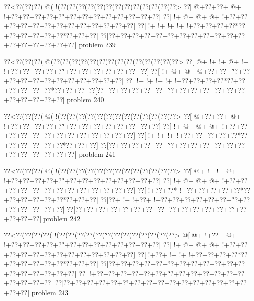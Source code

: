 \vbox{\vbox{\goo
\0??<\0??(\0??(\0??(\- @(\- !(\0??(\0??(\0??(\0??(\0??(\0??(\0??(\0??(\0??(\0??(\0??(\0??(\0??>
\0??[\- @+\0??+\0??+\- @+\- !+\0??+\0??+\0??+\0??+\0??+\0??+\0??+\0??+\0??+\0??+\0??+\0??+\0??]
\0??[\- !+\- @+\- @+\- @+\- !+\0??+\0??+\0??+\0??+\0??+\0??+\0??+\0??+\0??+\0??+\0??+\0??+\0??]
\0??[\- !+\- !+\- !+\- !+\- !+\0??+\0??+\0??+\0??*\0??+\0??+\0??+\0??+\0??+\0??*\0??+\0??+\0??]
\0??[\0??+\0??+\0??+\0??+\0??+\0??+\0??+\0??+\0??+\0??+\0??+\0??+\0??+\0??+\0??+\0??+\0??+\0??]
}
\hfil problem 239\hfil\break
}



\vbox{\vbox{\goo
\0??<\0??(\0??(\0??(\- @(\0??(\0??(\0??(\0??(\0??(\0??(\0??(\0??(\0??(\0??(\0??(\0??(\0??(\0??>
\0??[\- @+\- !+\- !+\- @+\- !+\- !+\0??+\0??+\0??+\0??+\0??+\0??+\0??+\0??+\0??+\0??+\0??+\0??]
\0??[\- !+\- @+\- @+\- @+\0??+\0??+\0??+\0??+\0??+\0??+\0??+\0??+\0??+\0??+\0??+\0??+\0??+\0??]
\0??[\- !+\- !+\- !+\- !+\- !+\0??+\0??+\0??+\0??*\0??+\0??+\0??+\0??+\0??+\0??*\0??+\0??+\0??]
\0??[\0??+\0??+\0??+\0??+\0??+\0??+\0??+\0??+\0??+\0??+\0??+\0??+\0??+\0??+\0??+\0??+\0??+\0??]
}
\hfil problem 240\hfil\break
}



\vbox{\vbox{\goo
\0??<\0??(\0??(\0??(\- @(\- !(\0??(\0??(\0??(\0??(\0??(\0??(\0??(\0??(\0??(\0??(\0??(\0??(\0??>
\0??[\- @+\0??+\0??+\- @+\- !+\0??+\0??+\0??+\0??+\0??+\0??+\0??+\0??+\0??+\0??+\0??+\0??+\0??]
\0??[\- !+\- @+\- @+\- @+\- !+\0??+\0??+\0??+\0??+\0??+\0??+\0??+\0??+\0??+\0??+\0??+\0??+\0??]
\0??[\- !+\- !+\- !+\- !+\0??+\0??+\0??+\0??+\0??*\0??+\0??+\0??+\0??+\0??+\0??*\0??+\0??+\0??]
\0??[\0??+\0??+\0??+\0??+\0??+\0??+\0??+\0??+\0??+\0??+\0??+\0??+\0??+\0??+\0??+\0??+\0??+\0??]
}
\hfil problem 241\hfil\break
}



\vbox{\vbox{\goo
\0??<\0??(\0??(\0??(\- @(\- !(\0??(\0??(\0??(\0??(\0??(\0??(\0??(\0??(\0??(\0??(\0??(\0??(\0??>
\0??[\- @+\- !+\- !+\- @+\- !+\0??+\0??+\0??+\0??+\0??+\0??+\0??+\0??+\0??+\0??+\0??+\0??+\0??]
\0??[\- !+\- @+\- @+\- @+\- !+\0??+\0??+\0??+\0??+\0??+\0??+\0??+\0??+\0??+\0??+\0??+\0??+\0??]
\0??[\- !+\0??+\0??*\- !+\0??+\0??+\0??+\0??+\0??*\0??+\0??+\0??+\0??+\0??+\0??*\0??+\0??+\0??]
\0??[\0??+\- !+\- !+\0??+\- !+\0??+\0??+\0??+\0??+\0??+\0??+\0??+\0??+\0??+\0??+\0??+\0??+\0??]
\0??[\0??+\0??+\0??+\0??+\0??+\0??+\0??+\0??+\0??+\0??+\0??+\0??+\0??+\0??+\0??+\0??+\0??+\0??]
}
\hfil problem 242\hfil\break
}



\vbox{\vbox{\goo
\0??<\0??(\0??(\0??(\0??(\- !(\0??(\0??(\0??(\0??(\0??(\0??(\0??(\0??(\0??(\0??(\0??(\0??(\0??>
\- @[\- @+\- !+\0??+\- @+\- !+\0??+\0??+\0??+\0??+\0??+\0??+\0??+\0??+\0??+\0??+\0??+\0??+\0??]
\0??[\- !+\- @+\- @+\- @+\- !+\0??+\0??+\0??+\0??+\0??+\0??+\0??+\0??+\0??+\0??+\0??+\0??+\0??]
\0??[\- !+\0??+\- !+\- !+\- !+\0??+\0??+\0??+\0??*\0??+\0??+\0??+\0??+\0??+\0??*\0??+\0??+\0??]
\0??[\0??+\0??+\0??+\0??+\0??+\0??+\0??+\0??+\0??+\0??+\0??+\0??+\0??+\0??+\0??+\0??+\0??+\0??]
\0??[\- !+\0??+\0??+\0??+\0??+\0??+\0??+\0??+\0??+\0??+\0??+\0??+\0??+\0??+\0??+\0??+\0??+\0??]
\0??[\0??+\0??+\0??+\0??+\0??+\0??+\0??+\0??+\0??+\0??+\0??+\0??+\0??+\0??+\0??+\0??+\0??+\0??]
}
\hfil problem 243\hfil\break
}



